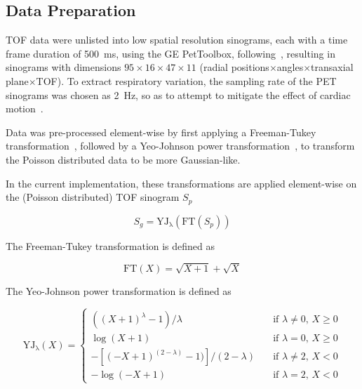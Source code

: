     \subsection{Data Preparation} \label{sec:data_preparation}
        \gls{TOF} data were unlisted into low spatial resolution sinograms, each with a time frame duration of \SI{500}{\milli\second}, using the \gls{GE} PetToolbox, following~\parencite{Bertolli2017DataData}, resulting in sinograms with dimensions $95\times16\times47\times11$ (radial positions$\times$angles$\times$transaxial plane$\times$\gls{TOF}). To extract respiratory variation, the sampling rate of the \gls{PET} sinograms was chosen as \SI{2}{\hertz}, so as to attempt to mitigate the effect of cardiac motion~\parencite{Bertolli2018Data-DrivenTomography}.
        
        Data was pre-processed element-wise by first applying a Freeman-Tukey transformation~\parencite{Freeman1950TransformationsRoot}, followed by a Yeo-Johnson power transformation~\parencite{Yeo2000ASymmetry}, to transform the Poisson distributed data to be more Gaussian-like.

        In the current implementation, these transformations are applied element-wise on the (Poisson distributed) \gls{TOF} sinogram $S_p$
        
        \begin{equation} \label{eq:freeman_tukey_yeo_johnson}
            S_g = \mathrm{YJ_\lambda}(\mathrm{FT}(S_p))
        \end{equation}

        The Freeman-Tukey transformation is defined as
        
        \begin{equation} \label{eq:freeman_tukey}
            \mathrm{FT}(X) = \sqrt{X + 1} + \sqrt{X}
        \end{equation}
        
        The Yeo-Johnson power transformation is defined as
        
        \begin{equation} \label{eq:yeo_johnson}
            \mathrm{YJ_\lambda}(X) =   \begin{cases}
                        ((X + 1)^\lambda - 1) / \lambda                   & \quad \text{if } \lambda \neq 0 \text{, } X \geq 0 \\
                        \log(X + 1)                                       & \quad \text{if } \lambda = 0 \text{, } X \geq 0    \\
                        -[(-X + 1)^{(2 - \lambda)} - 1)] / (2 - \lambda)  & \quad \text{if } \lambda \neq 2 \text{, } X < 0    \\
                        -\log(-X + 1)                                     & \quad \text{if } \lambda = 2 \text{, } X < 0
                    \end{cases}
        \end{equation}
        
